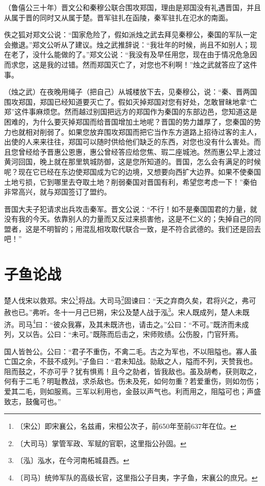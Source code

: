 \documentclass[12pt,UTF-8,openany]{ctexbook}
\begin{document}
\begin{normalsize}
    
    （鲁僖公三十年）晋文公和秦穆公联合围攻郑国，理由是郑国没有礼遇晋国，并且从属于晋的同时又从属于楚。晋军驻扎在函陵，秦军驻扎在氾水的南面。
    
    佚之狐对郑文公说：“国家危险了，假如派烛之武去拜见秦穆公，秦国的军队一定会撤退。”郑文公听从了建议。烛之武推辞说：“我壮年的时候，尚且不如别人；现在老了，没什么能做的了。”郑文公说：“我没有及早任用您，现在由于情况危急因而求您，这是我的过错。然而郑国灭亡了，对您也不利啊！”烛之武就答应了这件事。
    
    （烛之武）在夜晚用绳子（把自己）从城楼放下去，见秦穆公，说：“秦、晋两国围攻郑国，郑国已经知道要灭亡了。假如灭掉郑国对您有好处，怎敢冒昧地拿“亡郑”这件事麻烦您。然而越过别国把远方的郑国作为秦国的东部边邑，您知道这是困难的，为什么要灭掉郑国而给晋国增加土地呢？晋国的势力雄厚了，您秦国的势力也就相对削弱了。如果您放弃围攻郑国而把它当作东方道路上招待过客的主人，出使的人来来往往，郑国可以随时供给他们缺乏的东西，对您也没有什么害处。而且您曾经给予晋惠公恩惠，惠公曾经答应给您焦、瑕二座城池。然而惠公早上渡过黄河回国，晚上就在那里筑城防御，这是您所知道的。晋国，怎么会有满足的时候呢？现在它已经在东边使郑国成为它的边境，又想要向西扩大边界。如果不使秦国土地亏损，它到哪里去夺取土地？削弱秦国对晋国有利，希望您考虑一下！”秦伯非常高兴，就与郑国签订了盟约。
    
    晋国大夫子犯请求出兵攻击秦军。晋文公说：“不行！如不是秦国国君的力量，就没有我的今天。依靠别人的力量而又反过来损害他，这是不仁义的；失掉自己的同盟者，这是不明智的；用混乱相攻取代联合一致，是不符合武德的。我们还是回去吧！”
    
\end{normalsize}



\chapter{子鱼论战}

\begin{normalsize}
    
    楚人伐宋以救郑。宋公\footnote{〔宋公〕即宋襄公，名兹甫，宋桓公次子，前650年至前637年在位。}将战。大司马\footnote{〔大司马〕掌管军政、军赋的官职，这里指公孙固。}固谏曰：“天之弃商久矣，君将兴之，弗可赦也已。”弗听。冬十一月己巳朔，宋公及楚人战于泓\footnote{〔泓〕泓水，在今河南柘城县西。}。宋人既成列，楚人未既济。司马\footnote{〔司马〕统帅军队的高级长官，这里指公子目夷，字子鱼，宋襄公的庶兄。}曰：“彼众我寡，及其未既济也，请击之。”公曰：“不可。”既济而未成列，又以告。公曰：“未可。”既陈而后击之，宋师败绩。公伤股，门官歼焉。
    
    国人皆咎公。公曰：“君子不重伤，不禽二毛。古之为军也，不以阻隘也。寡人虽亡国之余，不鼓不成列。”子鱼曰：“君未知战。勍敌之人，隘而不列，天赞我也。阻而鼓之，不亦可乎？犹有惧焉！且今之勍者，皆我敌也。虽及胡耇，获则取之，何有于二毛？明耻教战，求杀敌也。伤未及死，如何勿重？若爱重伤，则如勿伤；爱其二毛，则如服焉。三军以利用也，金鼓以声气也。利而用之，阻隘可也；声盛致志，鼓儳可也。”
\end{normalsize}
\end{document}
